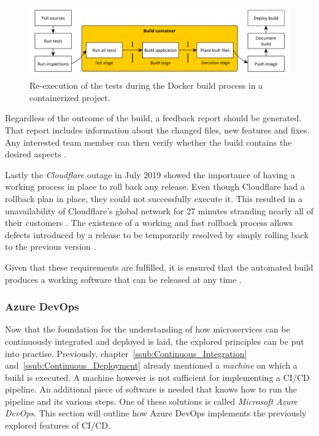 \begin{figure}[H]
\begin{center}
  \includegraphics[scale=0.6]{images/figures/ci_container_extended.pdf}
\end{center}
\caption{Re-execution of the tests during the Docker build process in a
containerized project.}%
\label{fig:container_ci_pipeline_extended}
\end{figure}

Regardless of the outcome of the build, a feedback report should be generated.
That report includes information about the changed files, new features and
fixes. Any interested team member can then verify whether the build contains
the desired aspects \autocite[pp. 196-198]{MatyasContinuousIntegration2007}.

Lastly the \textit{Cloudflare} outage in July 2019 showed the importance of
having a working process in place to roll back any release. Even though
Cloudflare had a rollback plan in place, they could not successfully execute
it. This resulted in a unavailability of Cloudflare's global network for 27
minutes stranding nearly all of their customers
\autocite{Graham-CummingDetailsCloudflareoutage2019}. The existence of a
working and fast rollback process allows defects introduced by a release to be
temporarily resolved by simply rolling back to the previous version
\autocite[p. 199]{MatyasContinuousIntegration2007}.

Given that these requirements are fulfilled, it is ensured that the automated
build produces a working software that can be released at any time \autocite[p.
200]{MatyasContinuousIntegration2007}.

\subsubsection{Azure DevOps}%
\label{ssub:Azure_DevOps}
Now that the foundation for the understanding of how microservices can be
continuously integrated and deployed is laid, the explored principles can be
put into practise. Previously, chapter~\ref{ssub:Continuous_Integration}
and~\ref{ssub:Continuous_Deployment} already mentioned a \textit{machine} on
which a build is executed. A machine however is not sufficient for implementing
a \ac{CI}/\ac{CD} pipeline. An additional piece of software is needed that
knows how to run the pipeline and its various steps. One of these solutions is
called \textit{Microsoft Azure DevOps}. This section will outline how Azure
DevOps implements the previously explored features of \ac{CI}/\ac{CD}.


